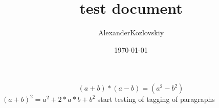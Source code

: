 \documentclass{article}
\title{test document}
\author{AlexanderKozlovskiy}
\date{\today}
\begin{document}
$$(a+b)*(a-b)=(a^2-b^2)$$ $(a+b)^2=a^2+2*a*b+b^2$
start testing of tagging of paragraphs
\end{document}
